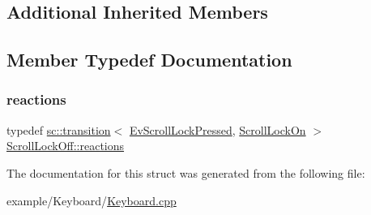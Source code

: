 \subsection*{Additional Inherited Members}


\subsection{Member Typedef Documentation}
\mbox{\label{struct_scroll_lock_off_a0230d61f6143fd5a9c48a3a34e071092}} 
\subsubsection{\texorpdfstring{reactions}{reactions}}
{\footnotesize\ttfamily typedef \mbox{\hyperlink{classboost_1_1statechart_1_1transition}{sc\+::transition}}$<$ \mbox{\hyperlink{struct_ev_scroll_lock_pressed}{Ev\+Scroll\+Lock\+Pressed}}, \mbox{\hyperlink{struct_scroll_lock_on}{Scroll\+Lock\+On}} $>$ \mbox{\hyperlink{struct_scroll_lock_off_a0230d61f6143fd5a9c48a3a34e071092}{Scroll\+Lock\+Off\+::reactions}}}



The documentation for this struct was generated from the following file\+:\begin{DoxyCompactItemize}
\item 
example/\+Keyboard/\mbox{\hyperlink{_keyboard_8cpp}{Keyboard.\+cpp}}\end{DoxyCompactItemize}
